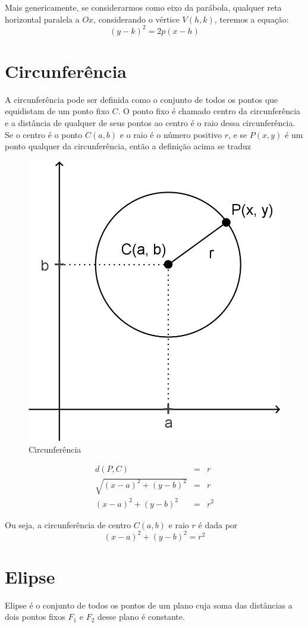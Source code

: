 Mais genericamente, se considerarmos como eixo da parábola, qualquer reta horizontal paralela a $Ox$, considerando o vértice $V(h, k)$, teremos a equação: $$(y-k)^2=2p(x-h)$$

\section{Circunferência}

A circunferência pode ser definida como o conjunto de todos os pontos que equidistam de um ponto fixo $C$. O ponto fixo é chamado centro da circunferência e a distância de qualquer de seus pontos ao centro é o raio dessa circunferência. Se o centro é o ponto $C(a, b)$ e o raio é o número positivo $r$, e se $P(x, y)$ é um ponto qualquer da circunferência, então a definição acima se traduz

\begin{multicols}{2}
\begin{figure}[H]
\centering
\includegraphics[width=0.45\linewidth]{analitica/imagens/circ1.png}
\caption{Circunferência}
\label{fig:circ1}
\end{figure}

\begin{eqnarray*}
d(P, C) & = & r   \\
\sqrt{(x-a)^2+(y-b)^2} & = & r  \\
(x-a)^2+(y-b)^2 & = & r^2
\end{eqnarray*}
\end{multicols}


Ou seja, a circunferência de centro $C(a, b)$ e raio $r$ é dada por $$(x-a)^2+(y-b)^2= r^2$$

\section{Elipse}

Elipse é o conjunto de todos os pontos de um plano cuja soma das distâncias a dois pontos fixos $F_1$ e $F_2$ desse plano é constante.


